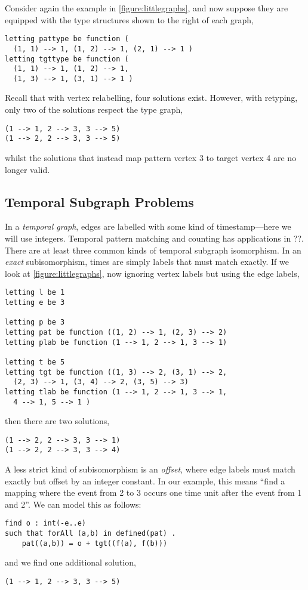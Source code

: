 \documentclass[runningheads]{llncs}
\begin{document}
Consider again the example in \cref{figure:littlegraphs}, and now suppose they are equipped with the type
structures shown to the right of each graph,
\begin{lstlisting}
letting pattype be function (
  (1, 1) --> 1, (1, 2) --> 1, (2, 1) --> 1 )
letting tgttype be function (
  (1, 1) --> 1, (1, 2) --> 1,
  (1, 3) --> 1, (3, 1) --> 1 )
\end{lstlisting}
Recall that with vertex relabelling, four solutions exist. However, with retyping, only two of the
solutions respect the type graph,
\begin{lstlisting}
(1 --> 1, 2 --> 3, 3 --> 5)
(1 --> 2, 2 --> 3, 3 --> 5)
\end{lstlisting}
whilst the solutions that instead map pattern vertex 3 to target vertex 4 are no longer valid.

\subsection{Temporal Subgraph Problems}\label{section:temporalgraphs}

In a \emph{temporal graph}, edges are labelled with some kind of timestamp---here we will use
integers. Temporal pattern matching and counting has applications in ??. There are at least three
common kinds of temporal subgraph isomorphism. In an \emph{exact} subisomorphism, times are simply
labels that must match exactly. If we look at \cref{figure:littlegraphs}, now ignoring vertex labels
but using the edge labels,
\begin{lstlisting}
letting l be 1
letting e be 3

letting p be 3
letting pat be function ((1, 2) --> 1, (2, 3) --> 2)
letting plab be function (1 --> 1, 2 --> 1, 3 --> 1)

letting t be 5
letting tgt be function ((1, 3) --> 2, (3, 1) --> 2,
  (2, 3) --> 1, (3, 4) --> 2, (3, 5) --> 3)
letting tlab be function (1 --> 1, 2 --> 1, 3 --> 1,
  4 --> 1, 5 --> 1 )
\end{lstlisting}
then there are two solutions,
\begin{lstlisting}
(1 --> 2, 2 --> 3, 3 --> 1)
(1 --> 2, 2 --> 3, 3 --> 4)
\end{lstlisting}

A less strict kind of subisomorphism is an \emph{offset}, where edge labels must match exactly but
offset by an integer constant. In our example, this means ``find a mapping where the event from 2
to 3 occurs one time unit after the event from 1 and 2''. We can model this as follows:
\begin{lstlisting}
find o : int(-e..e)
such that forAll (a,b) in defined(pat) .
    pat((a,b)) = o + tgt((f(a), f(b)))
\end{lstlisting}
and we find one additional solution,
\begin{lstlisting}
(1 --> 1, 2 --> 3, 3 --> 5)
\end{lstlisting}
\end{document}
